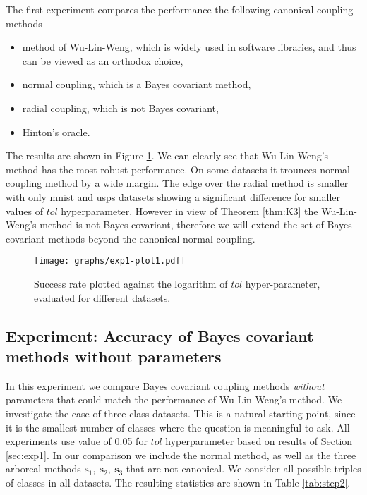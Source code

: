 The first experiment compares the performance the following canonical coupling methods
\begin{itemize}
\item method of Wu-Lin-Weng, which is widely used in software libraries, and thus can be viewed as an orthodox choice,
\item normal coupling, which is a Bayes covariant method,
\item radial coupling, which is not Bayes covariant,
\item Hinton's oracle.
\end{itemize}

% 
The results are shown in Figure \ref{fig:exp1-plot1}. We can clearly see that Wu-Lin-Weng's method has the most robust performance. On some datasets it trounces normal coupling method by a wide margin. The edge over the radial method is smaller with only mnist and usps datasets showing a significant difference for smaller values of $tol$ hyperparameter.  However in view of Theorem \ref{thm:K3} the Wu-Lin-Weng's method is not Bayes covariant, therefore we will extend the set of Bayes covariant methods beyond the canonical normal coupling.

\begin{figure}
	\texttt{[image: graphs/exp1-plot1.pdf]}
	\caption{Success rate plotted against the logarithm of $tol$ hyper-parameter, evaluated for different datasets.}
	\label{fig:exp1-plot1}
\end{figure}

\subsection{Experiment: Accuracy of Bayes covariant methods without parameters}
 \label{sec:exp2}


In this experiment we compare  Bayes covariant coupling methods \emph{without} parameters that could match the performance of Wu-Lin-Weng's method. We investigate  the case of three class datasets. This is a natural starting point, since it is the smallest number of classes where the question is meaningful to ask. All experiments use value of 0.05 for $tol$ hyperparameter based on results of Section \ref{sec:exp1}.  In our comparison we include the normal method, as well as the three arboreal methods $ \boldsymbol{s}_1,~ \boldsymbol{s}_2,~ \boldsymbol{s}_3$ that are not canonical. We consider all possible triples of classes in all datasets. The resulting statistics are shown in Table \ref{tab:step2}. 

